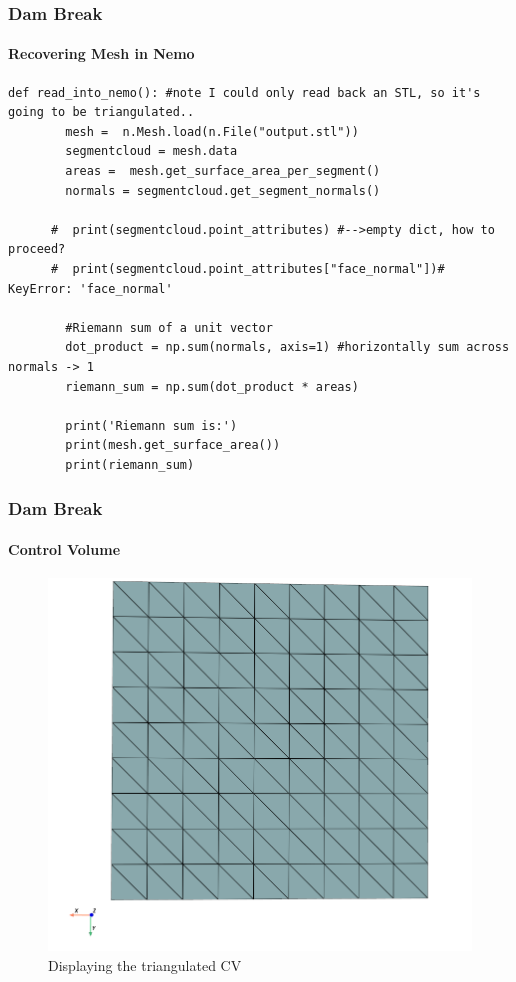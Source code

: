 \documentclass[notheorems, aspectratio=169]{beamer}
\begin{document}
  \begin{frame}[fragile]
    \frametitle{Dam Break}
    \framesubtitle{Recovering Mesh in Nemo}
    
    \begin{lstlisting}[style = python]
    def read_into_nemo(): #note I could only read back an STL, so it's going to be triangulated..
        mesh =  n.Mesh.load(n.File("output.stl"))
        segmentcloud = mesh.data
        areas =  mesh.get_surface_area_per_segment()
        normals = segmentcloud.get_segment_normals()
  
      #  print(segmentcloud.point_attributes) #-->empty dict, how to proceed?
      #  print(segmentcloud.point_attributes["face_normal"])# KeyError: 'face_normal'
        
        #Riemann sum of a unit vector
        dot_product = np.sum(normals, axis=1) #horizontally sum across normals -> 1
        riemann_sum = np.sum(dot_product * areas)
      
        print('Riemann sum is:')
        print(mesh.get_surface_area())
        print(riemann_sum)
    \end{lstlisting}
    
  \end{frame}

  
  \begin{frame}
    \frametitle{Dam Break}
    \framesubtitle{Control Volume}
    
    \begin{figure}
      \centering
      \includegraphics[width=0.5\linewidth]{pictures/control_volume.png} 
      \caption{Displaying the triangulated CV}
    \end{figure}
  
  \end{frame}
  
  
  
  
\end{document}
